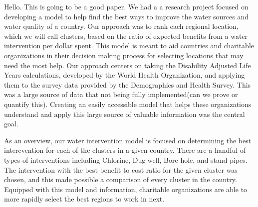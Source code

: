 Hello. This is going to be a good paper.
We had a a research project focused on developing a model to help find the best ways to improve the water sources and water quality of a country. Our approach was to rank each regional location, which we will call clusters, based on the ratio of expected benefits from a water intervention per dollar spent. This model is meant to aid countries and charitable organizations in their decision making process for selecting locations that may need the most help. Our approach centers on taking the Disability Adjusted Life Years calculations, developed by the World Health Organization, and applying them to the survey data provided by the Demographics and Health Survey. This was a large source of data that not being fully implemented(can we prove or quantify this). Creating an easily accessible model that helps these organizations understand and apply this large source of valuable information was the central goal.
	
As an overview, our water intervention model is focused on determining the best interevention for each of the clusters in a given country. There are a handful of types of interventions including Chlorine, Dug well, Bore hole, and stand pipes. The intervention with the best benefit to cost ratio for the given cluster was chosen, and this made possible a comparison of every cluster in the country. Equipped with this model and information, charitable organizations are able to more rapidly select the best regions to work in next.